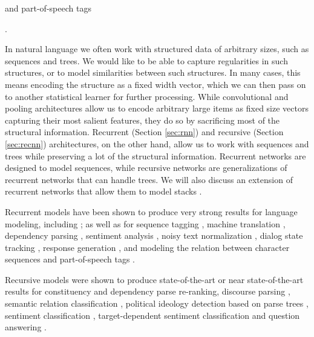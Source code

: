 \documentclass[jair,twoside,11pt,theapa]{article}
\newcommand{\ygcomment}[1]{\textbf{[TODO: #1]}}
\renewcommand{\ygcomment}[1]{}
\begin{document}
and part-of-speech tags {\cite{santos2014learning}.

In natural language we often work with structured data of arbitrary sizes, 
such as sequences and trees.  We would like to be able to capture regularities
in such structures, or to model similarities between such structures.  In many
cases, this means encoding the structure as a fixed width vector, which we can
then pass on to another statistical learner for further processing. While
convolutional and pooling architectures allow us to encode arbitrary large items
as fixed size vectors capturing their most salient features, they do so by sacrificing
most of the structural information. Recurrent (Section \ref{sec:rnn}) and
recursive (Section \ref{sec:recnn}) architectures, on
the other hand, allow us to work with sequences and trees while preserving a lot
of the structural information. Recurrent networks \cite{elman1990finding} are designed to model
sequences, while recursive networks \cite{goller1996learning} are generalizations of recurrent networks
that can handle trees.  We will also discuss an extension of recurrent networks that
allow them to model stacks
\cite{dyer2015transitionbased,watanabe2015transitionbased}. 

Recurrent models have been shown to produce very
strong results for language modeling, including
\cite{mikolov2010recurrent,mikolov2011extensions,mikolov2012statistical,duh2013adaptation,adel2013combination,auli2013joint,auli2014decoder};
as well as for sequence tagging 
\cite{irsoy2014opinion,xu2015ccg,ling2015finding}, machine translation
\cite{sundermeyer2014translation,tamura2014recurrent,sutskever2014sequence,cho2014learning},
dependency parsing \cite{dyer2015transitionbased,watanabe2015transitionbased},
sentiment analysis \cite{wang2015predicting}, noisy text normalization
\cite{chrupala2014normalizing}, dialog state tracking
\cite{mrksic2015multidomain}, response generation \cite{sordoni2015neural}, and
modeling the relation between character sequences and part-of-speech
tags \cite{ling2015finding}.  \ygcomment{mention the multi-modal stuff?}

Recursive models were shown to produce state-of-the-art or near state-of-the-art results for 
constituency 
\cite{socher2013parsing} and dependency \cite{le2014insideoutside,zhu2015reranking}
parse re-ranking, discourse parsing \cite{li2014recursive}, semantic relation classification
\cite{hashimoto2013simple,liu2015dependencybased},
political ideology detection based on parse trees \cite{iyyer2014political},
sentiment classification \cite{socher2013recursive,hermann2013role},
target-dependent sentiment classification \cite{dong2014adaptive} and
question answering \cite{iyyer2014neural}.


}
\end{document}

